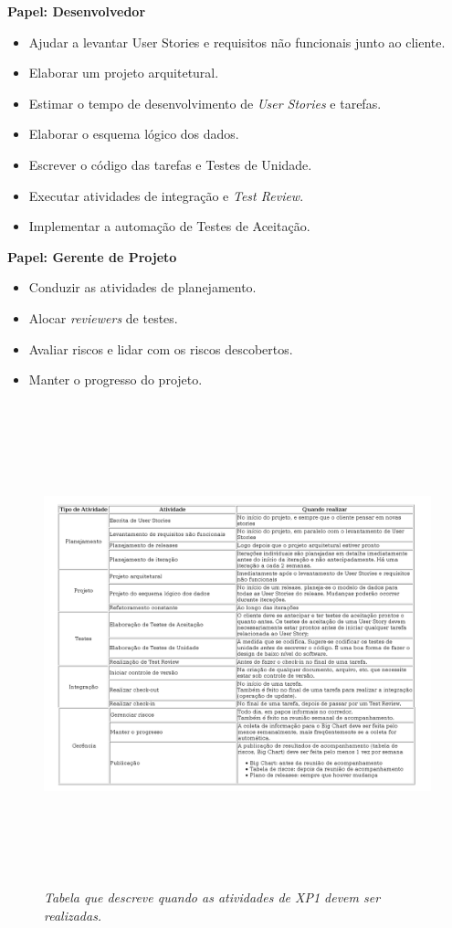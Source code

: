 \textbf{Papel: Desenvolvedor}
\begin{itemize}
 \item Ajudar a levantar User Stories e requisitos não funcionais junto ao cliente.
 \item Elaborar um projeto arquitetural.
 \item Estimar o tempo de desenvolvimento de \textit{User Stories} e tarefas.
 \item Elaborar o esquema lógico dos dados.
 \item Escrever o código das tarefas e Testes de Unidade.
 \item Executar atividades de integração e \textit{Test Review}.
 \item Implementar a automação de Testes de Aceitação.
\end{itemize}

\textbf{Papel: Gerente de Projeto}
\begin{itemize}
 \item Conduzir as atividades de planejamento.
 \item Alocar \textit{reviewers} de testes.
 \item Avaliar riscos e lidar com os riscos descobertos.
 \item Manter o progresso do projeto.
\end{itemize}

\begin{figure}[!h]
 \includegraphics[height = 14cm]{tab1.png}
 \caption{\it Tabela que descreve quando as atividades de XP1 devem ser realizadas.} \label{tab:tab1}
\end{figure}

